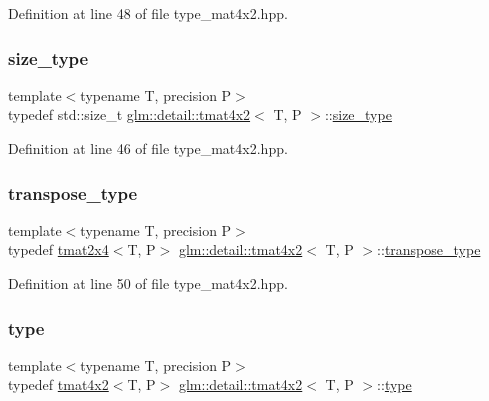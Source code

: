 Definition at line 48 of file type\+\_\+mat4x2.\+hpp.

\mbox{\label{structglm_1_1detail_1_1tmat4x2_aaf03e298b1377068358fc09cdfcd889a}} 
\subsubsection{\texorpdfstring{size\+\_\+type}{size\_type}}
{\footnotesize\ttfamily template$<$typename T, precision P$>$ \\
typedef std\+::size\+\_\+t \hyperlink{structglm_1_1detail_1_1tmat4x2}{glm\+::detail\+::tmat4x2}$<$ T, P $>$\+::\hyperlink{structglm_1_1detail_1_1tmat4x2_aaf03e298b1377068358fc09cdfcd889a}{size\+\_\+type}}



Definition at line 46 of file type\+\_\+mat4x2.\+hpp.

\mbox{\label{structglm_1_1detail_1_1tmat4x2_a2093723021c90d6591afa09a5c8a0bdf}} 
\subsubsection{\texorpdfstring{transpose\+\_\+type}{transpose\_type}}
{\footnotesize\ttfamily template$<$typename T, precision P$>$ \\
typedef \hyperlink{structglm_1_1detail_1_1tmat2x4}{tmat2x4}$<$T, P$>$ \hyperlink{structglm_1_1detail_1_1tmat4x2}{glm\+::detail\+::tmat4x2}$<$ T, P $>$\+::\hyperlink{structglm_1_1detail_1_1tmat4x2_a2093723021c90d6591afa09a5c8a0bdf}{transpose\+\_\+type}}



Definition at line 50 of file type\+\_\+mat4x2.\+hpp.

\mbox{\label{structglm_1_1detail_1_1tmat4x2_a0906a5a3d185ed08196fd6657436eb56}} 
\subsubsection{\texorpdfstring{type}{type}}
{\footnotesize\ttfamily template$<$typename T, precision P$>$ \\
typedef \hyperlink{structglm_1_1detail_1_1tmat4x2}{tmat4x2}$<$T, P$>$ \hyperlink{structglm_1_1detail_1_1tmat4x2}{glm\+::detail\+::tmat4x2}$<$ T, P $>$\+::\hyperlink{structglm_1_1detail_1_1tmat4x2_a0906a5a3d185ed08196fd6657436eb56}{type}}



